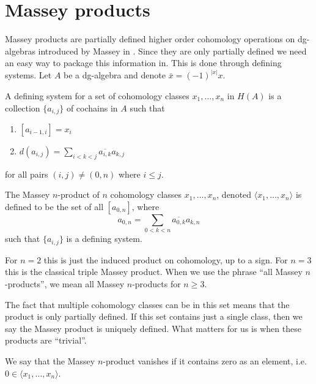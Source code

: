 

\section{Massey products}

Massey products are partially defined higher order cohomology operations on dg-algebras
introduced by Massey in \cite{Massey}. Since they are only partially defined we need an 
easy way to package this information in. This is done through defining systems. Let $A$ 
be a dg-algebra and denote $\bar{x} = (-1)^{|x|}x$. 

\begin{definition}
    A defining system for a set of cohomology classes $x_1, \ldots, x_n$ 
    in $H(A)$ is a collection $\{ a_{i,j}\}$ of cochains in $A$ such that
    \begin{enumerate}
        \item $[a_{i-1, i}] = x_i$
        \item $d(a_{i, j}) = \sum_{i<k<j}\overline{a_{i, k}}a_{k, j}$
    \end{enumerate}
    for all pairs $(i,j)\neq (0,n)$ where $i\leq j$.
\end{definition}

\begin{definition}
    The Massey $n$-product of $n$ cohomology classes $x_1, \ldots, x_n$, 
    denoted $\langle x_1, \ldots, x_n\rangle$ is defined to be the set of all $[a_{0,n}]$, 
    where $$a_{0,n} = \sum_{0<k<n}\overline{a_{0, k}}a_{k, n}$$ such that $\{ a_{i,j} \}$ 
    is a defining system.         
\end{definition}

For $n=2$ this is just the induced product on cohomology, up to a sign. For $n=3$ this 
is the classical triple Massey product. When we use the phrase ``all Massey $n$-products'', 
we mean all Massey $n$-products for $n\geq 3$. 

The fact that multiple cohomology classes can be in this set means that the product is 
only partially defined. If this set contains just a single class, then we say the Massey 
product is uniquely defined. What matters for us is when these products are ``trivial''. 

\begin{definition}
    We say that the Massey $n$-product vanishes if it contains zero as an 
    element, i.e. $0\in \langle x_1, \ldots, x_n\rangle$.    
\end{definition}

